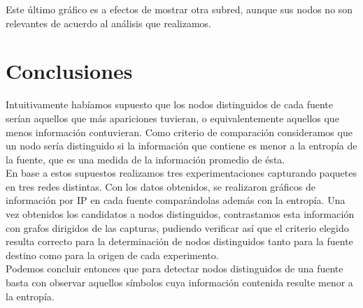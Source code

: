 \indent Este último gráfico es a efectos de mostrar otra subred, aunque sus nodos no son relevantes de acuerdo al análisis que realizamos.\\


\section{Conclusiones}

\indent \indent Intuitivamente habíamos supuesto que los nodos distinguidos de cada fuente serían aquellos que más apariciones tuvieran, o equivalentemente aquellos que menos información contuvieran. Como criterio de comparación consideramos que un nodo sería distinguido si la información que contiene es menor a la entropía de la fuente, que es una medida de la información promedio de ésta.\\
\indent En base a estos supuestos realizamos tres experimentaciones capturando paquetes en tres redes distintas. Con los datos obtenidos, se realizaron gráficos de información por IP en cada fuente comparándolas además con la entropía. Una vez obtenidos los candidatos a nodos distinguidos, contrastamos esta información con grafos dirigidos de las capturas, pudiendo verificar así que el criterio elegido resulta correcto para la determinación de nodos distinguidos tanto para la fuente destino como para la origen de cada experimento.\\
\indent Podemos concluir entonces que para detectar nodos distinguidos de una fuente basta con observar aquellos símbolos cuya información contenida resulte menor a la entropía.\\ 